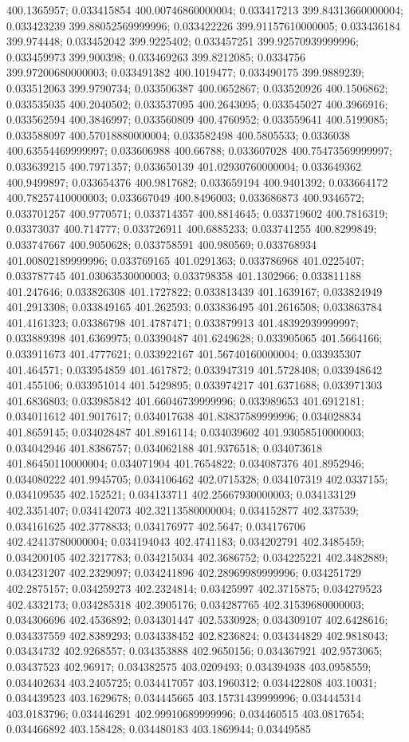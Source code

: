 400.1365957; 0.033415854 400.00746860000004; 0.033417213 399.84313660000004; 0.033423239 399.88052569999996; 0.033422226 399.91157610000005; 0.033436184 399.974448; 0.033452042 399.9225402; 0.033457251 399.92570939999996; 0.033459973 399.900398; 0.033469263 399.8212085; 0.0334756 399.97200680000003; 0.033491382 400.1019477; 0.033490175 399.9889239; 0.033512063 399.9790734; 0.033506387 400.0652867; 0.033520926 400.1506862; 0.033535035 400.2040502; 0.033537095 400.2643095; 0.033545027 400.3966916; 0.033562594 400.3846997; 0.033560809 400.4760952; 0.033559641 400.5199085; 0.033588097 400.57018880000004; 0.033582498 400.5805533; 0.0336038 400.63554469999997; 0.033606988 400.66788; 0.033607028 400.75473569999997; 0.033639215 400.7971357; 0.033650139 401.02930760000004; 0.033649362 400.9499897; 0.033654376 400.9817682; 0.033659194 400.9401392; 0.033664172 400.78257410000003; 0.033667049 400.8496003; 0.033686873 400.9346572; 0.033701257 400.9770571; 0.033714357 400.8814645; 0.033719602 400.7816319; 0.03373037 400.714777; 0.033726911 400.6885233; 0.033741255 400.8299849; 0.033747667 400.9050628; 0.033758591 400.980569; 0.033768934 401.00802189999996; 0.033769165 401.0291363; 0.033786968 401.0225407; 0.033787745 401.03063530000003; 0.033798358 401.1302966; 0.033811188 401.247646; 0.033826308 401.1727822; 0.033813439 401.1639167; 0.033824949 401.2913308; 0.033849165 401.262593; 0.033836495 401.2616508; 0.033863784 401.4161323; 0.03386798 401.4787471; 0.033879913 401.48392939999997; 0.033889398 401.6369975; 0.03390487 401.6249628; 0.033905065 401.5664166; 0.033911673 401.4777621; 0.033922167 401.56740160000004; 0.033935307 401.464571; 0.033954859 401.4617872; 0.033947319 401.5728408; 0.033948642 401.455106; 0.033951014 401.5429895; 0.033974217 401.6371688; 0.033971303 401.6836803; 0.033985842 401.66046739999996; 0.033989653 401.6912181; 0.034011612 401.9017617; 0.034017638 401.83837589999996; 0.034028834 401.8659145; 0.034028487 401.8916114; 0.034039602 401.93058510000003; 0.034042946 401.8386757; 0.034062188 401.9376518; 0.034073618 401.86450110000004; 0.034071904 401.7654822; 0.034087376 401.8952946; 0.034080222 401.9945705; 0.034106462 402.0715328; 0.034107319 402.0337155; 0.034109535 402.152521; 0.034133711 402.25667930000003; 0.034133129 402.3351407; 0.034142073 402.32113580000004; 0.034152877 402.337539; 0.034161625 402.3778833; 0.034176977 402.5647; 0.034176706 402.42413780000004; 0.034194043 402.4741183; 0.034202791 402.3485459; 0.034200105 402.3217783; 0.034215034 402.3686752; 0.034225221 402.3482889; 0.034231207 402.2329097; 0.034241896 402.28969989999996; 0.034251729 402.2875157; 0.034259273 402.2324814; 0.03425997 402.3715875; 0.034279523 402.4332173; 0.034285318 402.3905176; 0.034287765 402.31539680000003; 0.034306696 402.4536892; 0.034301447 402.5330928; 0.034309107 402.6428616; 0.034337559 402.8389293; 0.034338452 402.8236824; 0.034344829 402.9818043; 0.03434732 402.9268557; 0.034353888 402.9650156; 0.034367921 402.9573065; 0.03437523 402.96917; 0.034382575 403.0209493; 0.034394938 403.0958559; 0.034402634 403.2405725; 0.034417057 403.1960312; 0.034422808 403.10031; 0.034439523 403.1629678; 0.034445665 403.15731439999996; 0.034445314 403.0183796; 0.034446291 402.99910689999996; 0.034460515 403.0817654; 0.034466892 403.158428; 0.034480183 403.1869944; 0.03449585 